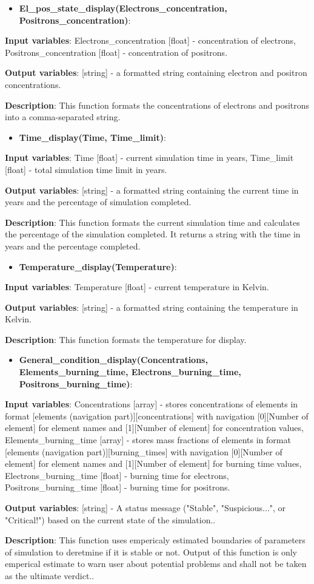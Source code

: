 \documentclass[a4paper,12pt]{article}
\newcommand{\namefunction}[4]{
  \begin{itemize}
    \item \textbf{#1}:
  \end{itemize}
  
  \textbf{Input variables}: #2.
  
  \textbf{Output variables}: #4.
  
  \textbf{Description}: #3.
}
\begin{document}
\vspace{1em}

\namefunction{El\_pos\_state\_display(Electrons\_concentration, Positrons\_concentration)}{Electrons\_concentration [float] - concentration of electrons, Positrons\_concentration [float] - concentration of positrons}{This function formats the concentrations of electrons and positrons into a comma-separated string}{[string] - a formatted string containing electron and positron concentrations}

\vspace{1em}

\namefunction{Time\_display(Time, Time\_limit)}{Time [float] - current simulation time in years, Time\_limit [float] - total simulation time limit in years}{This function formats the current simulation time and calculates the percentage of the simulation completed. It returns a string with the time in years and the percentage completed}{[string] - a formatted string containing the current time in years and the percentage of simulation completed}

\vspace{1em}

\namefunction{Temperature\_display(Temperature)}{Temperature [float] - current temperature in Kelvin}{This function formats the temperature for display}{[string] - a formatted string containing the temperature in Kelvin}

\vspace{1em}

\namefunction{General\_condition\_display(Concentrations, Elements\_burning\_time, Electrons\_burning\_time, Positrons\_burning\_time)}{Concentrations [array] - stores concentrations of elements in format [elements (navigation part)][concentrations] with navigation [0][Number of element] for element names and [1][Number of element] for concentration values, Elements\_burning\_time [array] - stores mass fractions of elements in format [elements (navigation part)][burning\_times] with navigation [0][Number of element] for element names and [1][Number of element] for burning time values, Electrons\_burning\_time [float] - burning time for electrons, Positrons\_burning\_time [float] - burning time for positrons}
{This function uses empericaly estimated boundaries of parameters of simulation to deretmine if it is stable or not. Output of this function is only emperical estimate to warn user about potential problems and shall not be taken as the ultimate verdict.}
{[string] - A status message ("Stable", "Suspicious...", or "Critical!") based on the current state of the simulation.}
\end{document}
